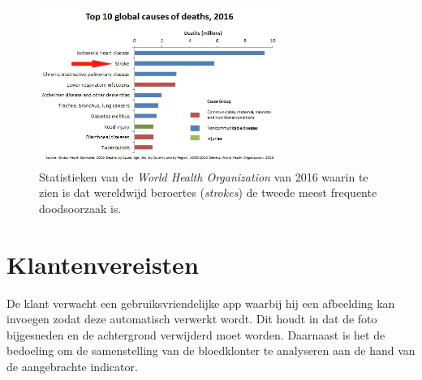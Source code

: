 \documentclass[a4paper,kulak]{kulakarticle}
\begin{document}
		\begin{figure}[h]
			\centering
			\includegraphics[width = 0.7\textwidth]{top10doodsoorzaken.jpg}
			
			\caption{Statistieken van de \textit{World Health Organization} van 2016 waarin te zien is dat wereldwijd beroertes (\textit{strokes}) de tweede meest frequente doodsoorzaak is.}
			\label{figuur doodsoorzaken}
		\end{figure}
	\newpage
		
	\tableofcontents
	\newpage
		
	\section{Klantenvereisten}
		De klant verwacht een gebruiksvriendelijke app waarbij hij een afbeelding kan invoegen zodat deze automatisch verwerkt wordt. Dit houdt in dat de foto bijgesneden en de achtergrond verwijderd moet worden. Daarnaast is het de bedoeling om de samenstelling van de bloedklonter te analyseren aan de hand van de aangebrachte indicator.
	
\end{document}
